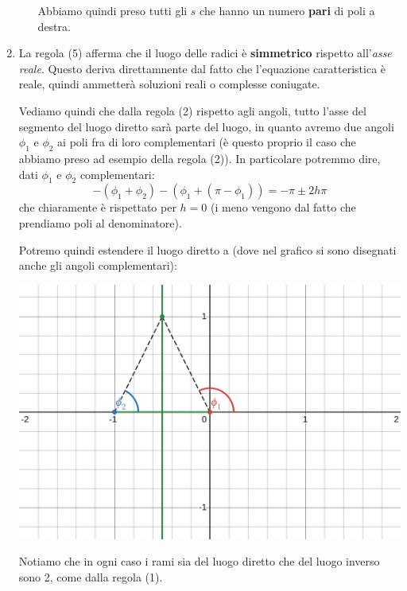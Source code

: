 \documentclass[a4paper,11pt]{article}
\begin{document}
\begin{enumerate}
\begin{itemize}
				Abbiamo quindi preso tutti gli $s$ che hanno un numero \textbf{pari} di poli a destra.
		\end{itemize}

	\item
		La regola (5) afferma che il luogo delle radici è \textbf{simmetrico} rispetto all'\textit{asse reale}.
		Questo deriva direttamnente dal fatto che l'equazione caratteristica è reale, quindi ammetterà soluzioni reali o complesse coniugate.

		Vediamo quindi che dalla regola (2) rispetto agli angoli, tutto l'asse del segmento del luogo diretto sarà parte del luogo, in quanto avremo due angoli $\phi_1$ e $\phi_2$ ai poli fra di loro complementari (è questo proprio il caso che abbiamo preso ad esempio della regola (2)).
		In particolare potremmo dire, dati $\phi_1$ e $\phi_2$ complementari:
		$$
		-(\phi_1 + \phi_2) -(\phi_1 + (\pi - \phi_1)) = -\pi \pm 2 h \pi
		$$
		che chiaramente è rispettato per $h = 0$ (i meno vengono dal fatto che prendiamo poli al denominatore).

		Potremo quindi estendere il luogo diretto a (dove nel grafico si sono disegnati anche gli angoli complementari):
		\begin{center}
			\includegraphics[scale=0.26]{../figures/locus_dc.png}
		\end{center}
		
		Notiamo che in ogni caso i rami sia del luogo diretto che del luogo inverso sono 2, come dalla regola (1).
\end{enumerate}
\end{document}
